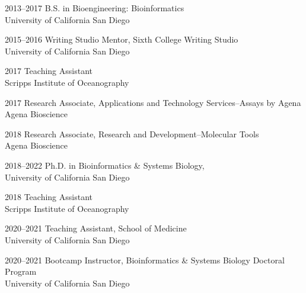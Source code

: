 \documentclass[11pt]{formatting-template}
\begin{document}
\tableofcontents
\listoffigures
\listoftables

\begin{acknowledgements}
	
\end{acknowledgements}

\begin{vita}
\noindent
\begin{cv}{}
\begin{cvlist}{}
	\item[2013--2017] B.S. in Bioengineering: Bioinformatics\\
		University of California San Diego
	\item[2015--2016] Writing Studio Mentor, Sixth College Writing Studio\\
		University of California San Diego
	\item[2017] Teaching Assistant\\Scripps Institute of Oceanography 
	\item[2017] Research Associate, Applications and Technology Services--Assays by Agena\\
		Agena Bioscience
	\item[2018] Research Associate, Research and Development--Molecular Tools\\
		Agena Bioscience 
	\item[2018--2022] Ph.D. in Bioinformatics \& Systems Biology,\\
		University of California San Diego
	\item[2018] Teaching Assistant\\
		Scripps Institute of Oceanography
	\item[2020--2021] Teaching Assistant, School of Medicine\\
		University of California San Diego 
	\item[2020--2021] Bootcamp Instructor, Bioinformatics \& Systems Biology Doctoral Program\\
		University of California San Diego 
\end{cvlist}
\end{cv}

\publications{}


\end{vita}
\end{document}
